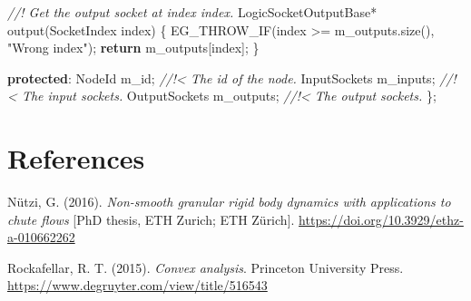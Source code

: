 \documentclass[
  12pt,
  american,
  a4paper,
  twoside,
  titlepage,
  openright,
  numbers=noenddot,
  chapterprefix=true,
  headings=optiontohead,
  svgnames,
  dvipsnames]{scrreprt}
\newenvironment{Shaded}{}{}
\newcommand{\CommentTok}[1]{\textcolor[rgb]{0.38,0.63,0.69}{\textit{#1}}}
\newcommand{\ControlFlowTok}[1]{\textcolor[rgb]{0.00,0.44,0.13}{\textbf{#1}}}
\newcommand{\KeywordTok}[1]{\textcolor[rgb]{0.00,0.44,0.13}{\textbf{#1}}}
\newcommand{\NormalTok}[1]{#1}
\newcommand{\StringTok}[1]{\textcolor[rgb]{0.25,0.44,0.63}{#1}}
\newcommand{\VariableTok}[1]{\textcolor[rgb]{0.10,0.09,0.49}{#1}}
\newlength{\cslhangindent}
\newenvironment{cslreferences}%
  {\setlength{\parindent}{0pt}%
  \everypar{\setlength{\hangindent}{\cslhangindent}}\ignorespaces}%
  {\par}
\begin{document}
\begin{Shaded}
\begin{Highlighting}[numbers=left,,]
    \CommentTok{//! Get the output socket at index \textasciigrave{}index\textasciigrave{}.}
\NormalTok{    LogicSocketOutputBase* output(SocketIndex index)}
\NormalTok{    \{}
\NormalTok{        EG\_THROW\_IF(index \textgreater{}= }\VariableTok{m\_outputs}\NormalTok{.size(), }\StringTok{"Wrong index"}\NormalTok{);}
        \ControlFlowTok{return} \VariableTok{m\_outputs}\NormalTok{[index];}
\NormalTok{    \}}

\KeywordTok{protected}\NormalTok{:}
\NormalTok{    NodeId }\VariableTok{m\_id}\NormalTok{;              }\CommentTok{//!\textless{} The id of the node.}
\NormalTok{    InputSockets }\VariableTok{m\_inputs}\NormalTok{;    }\CommentTok{//!\textless{} The input sockets.}
\NormalTok{    OutputSockets }\VariableTok{m\_outputs}\NormalTok{;  }\CommentTok{//!\textless{} The output sockets.}
\NormalTok{\};}
\end{Highlighting}
\end{Shaded}

\hypertarget{references}{%
\chapter*{References}\label{references}}

\hypertarget{refs}{}
\begin{cslreferences}
\leavevmode\hypertarget{ref-nuetzig_thesis_2016}{}%
Nützi, G. (2016). \emph{Non-smooth granular rigid body dynamics with
applications to chute flows} {[}PhD thesis, ETH Zurich; ETH Zürich{]}.
\url{https://doi.org/10.3929/ethz-a-010662262}

\leavevmode\hypertarget{ref-rockafellar_convex_2015}{}%
Rockafellar, R. T. (2015). \emph{Convex analysis}. Princeton University
Press. \url{https://www.degruyter.com/view/title/516543}
\end{cslreferences}
\end{document}
